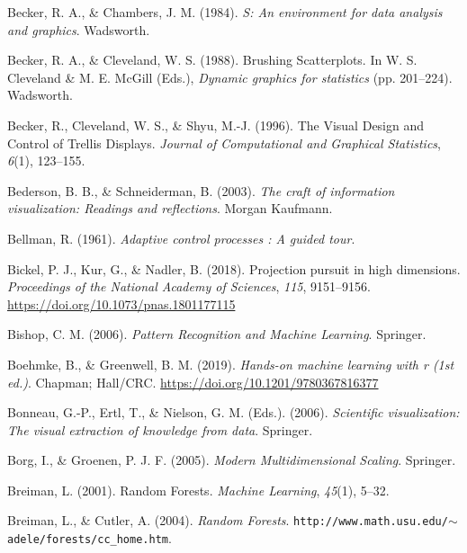 \documentclass[
  letterpaper,
]{book}
\newlength{\cslhangindent}
\newlength{\cslentryspacingunit} %
\newenvironment{CSLReferences}[2] %
 {%
  \setlength{\parindent}{0pt}
  \ifodd #1
  \let\oldpar\par
  \def\par{\hangindent=\cslhangindent\oldpar}
  \fi
  \setlength{\parskip}{#2\cslentryspacingunit}
 }%
 {}
\begin{document}
\begin{CSLReferences}{1}{0}
\leavevmode{}%
Becker, R. A., \& Chambers, J. M. (1984). \emph{{S}: An environment for
data analysis and graphics}. Wadsworth.

\leavevmode{}%
Becker, R. A., \& Cleveland, W. S. (1988). {B}rushing {S}catterplots. In
W. S. Cleveland \& M. E. McGill (Eds.), \emph{Dynamic graphics for
statistics} (pp. 201--224). Wadsworth.

\leavevmode{}%
Becker, R., Cleveland, W. S., \& Shyu, M.-J. (1996). {T}he {V}isual
{D}esign and {C}ontrol of {T}rellis {D}isplays. \emph{Journal of
Computational and Graphical Statistics}, \emph{6}(1), 123--155.

\leavevmode{}%
Bederson, B. B., \& Schneiderman, B. (2003). \emph{The craft of
information visualization: Readings and reflections}. Morgan Kaufmann.

\leavevmode{}%
Bellman, R. (1961). \emph{Adaptive control processes : A guided tour}.

\leavevmode{}%
Bickel, P. J., Kur, G., \& Nadler, B. (2018). Projection pursuit in high
dimensions. \emph{Proceedings of the National Academy of Sciences},
\emph{115}, 9151--9156. \url{https://doi.org/10.1073/pnas.1801177115}

\leavevmode{}%
Bishop, C. M. (2006). \emph{Pattern {R}ecognition and {M}achine
{L}earning}. Springer.

\leavevmode{}%
Boehmke, B., \& Greenwell, B. M. (2019). \emph{Hands-on machine learning
with r (1st ed.)}. Chapman; Hall/CRC.
\url{https://doi.org/10.1201/9780367816377}

\leavevmode{}%
Bonneau, G.-P., Ertl, T., \& Nielson, G. M. (Eds.). (2006).
\emph{Scientific visualization: The visual extraction of knowledge from
data}. Springer.

\leavevmode{}%
Borg, I., \& Groenen, P. J. F. (2005). \emph{Modern {M}ultidimensional
{S}caling}. Springer.

\leavevmode{}%
Breiman, L. (2001). Random {F}orests. \emph{Machine Learning},
\emph{45}(1), 5--32.

\leavevmode{}%
Breiman, L., \& Cutler, A. (2004). \emph{Random {F}orests}.
{\texttt{http://www.math.usu.edu/}\(\sim\)\texttt{adele/forests/cc\_home.htm}}.


\end{CSLReferences}
\end{document}
